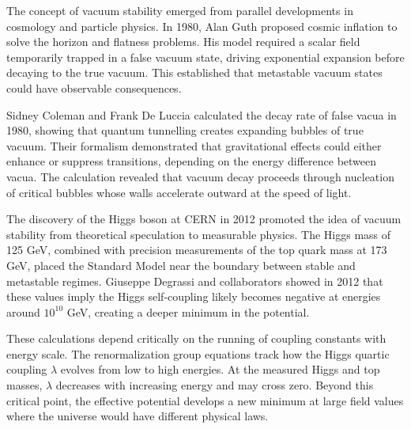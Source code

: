 
\begin{historical}
    The concept of vacuum stability emerged from parallel developments in cosmology and particle physics. In 1980, Alan Guth proposed cosmic inflation to solve the horizon and flatness problems. His model required a scalar field temporarily trapped in a false vacuum state, driving exponential expansion before decaying to the true vacuum. This established that metastable vacuum states could have observable consequences.

    Sidney Coleman and Frank De Luccia calculated the decay rate of false vacua in 1980, showing that quantum tunnelling creates expanding bubbles of true vacuum. Their formalism demonstrated that gravitational effects could either enhance or suppress transitions, depending on the energy difference between vacua. The calculation revealed that vacuum decay proceeds through nucleation of critical bubbles whose walls accelerate outward at the speed of light.

    The discovery of the Higgs boson at CERN in 2012 promoted the idea of vacuum stability from theoretical speculation to measurable physics. The Higgs mass of 125 GeV, combined with precision measurements of the top quark mass at 173 GeV, placed the Standard Model near the boundary between stable and metastable regimes. Giuseppe Degrassi and collaborators showed in 2012 that these values imply the Higgs self-coupling likely becomes negative at energies around $10^{10}$ GeV, creating a deeper minimum in the potential.

    These calculations depend critically on the running of coupling constants with energy scale. The renormalization group equations track how the Higgs quartic coupling $\lambda$ evolves from low to high energies. At the measured Higgs and top masses, $\lambda$ decreases with increasing energy and may cross zero. Beyond this critical point, the effective potential develops a new minimum at large field values where the universe would have different physical laws.
\end{historical}